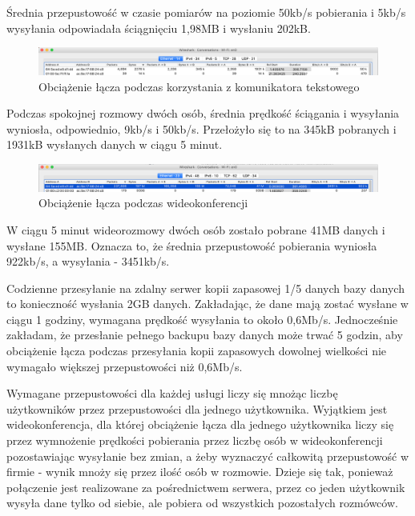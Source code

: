 \documentclass[12pt,a4paper,titlepage]{article}
\begin{document}
Średnia przepustowość w czasie pomiarów na poziomie 50kb/s pobierania i 5kb/s wysyłania odpowiadała ściągnięciu 1,98MB i wysłaniu 202kB.

\vspace{1cm}
\begin{figure}[H]
  \centering
    \includegraphics[width=14cm]{message.png}
    \caption{Obciążenie łącza podczas korzystania z komunikatora tekstowego}
    \label{fig:disco}
\end{figure}

Podczas spokojnej rozmowy dwóch osób, średnia prędkość ściągania i wysyłania wyniosła, odpowiednio, 9kb/s i 50kb/s. Przełożyło się to na 345kB pobranych i 1931kB wysłanych danych w ciągu 5 minut.

\vspace{1cm}
\begin{figure}[H]
  \centering
    \includegraphics[width=14cm]{wideo.png}
    \caption{Obciążenie łącza podczas wideokonferencji}
    \label{fig:wideo}
\end{figure}

W ciągu 5 minut wideorozmowy dwóch osób zostało pobrane 41MB danych i wysłane 155MB. Oznacza to, że średnia przepustowość pobierania wyniosła 922kb/s, a wysyłania - 3451kb/s.
\vspace{3cm}

Codzienne przesyłanie na zdalny serwer kopii zapasowej 1/5 danych bazy danych to konieczność wysłania 2GB danych. Zakładając, że dane mają zostać wysłane w ciągu 1 godziny, wymagana prędkość wysyłania to około 0,6Mb/s. Jednocześnie zakładam, że przesłanie pełnego backupu bazy danych może trwać 5 godzin, aby obciążenie łącza podczas przesyłania kopii zapasowych dowolnej wielkości nie wymagało większej przepustowości niż 0,6Mb/s. 

\vspace{1cm}
Wymagane przepustowości dla każdej usługi liczy się mnożąc liczbę użytkowników przez przepustowości dla jednego użytkownika. Wyjątkiem jest wideokonferencja, dla której obciążenie łącza dla jednego użytkownika liczy się przez wymnożenie prędkości pobierania przez liczbę osób w wideokonferencji pozostawiając wysyłanie bez zmian, a żeby wyznaczyć całkowitą przepustowość w firmie - wynik mnoży się przez ilość osób w rozmowie. Dzieje się tak, ponieważ połączenie jest realizowane za pośrednictwem serwera, przez co jeden użytkownik wysyła dane tylko od siebie, ale pobiera od wszystkich pozostałych rozmówców.
\vspace{1cm}
\end{document}
